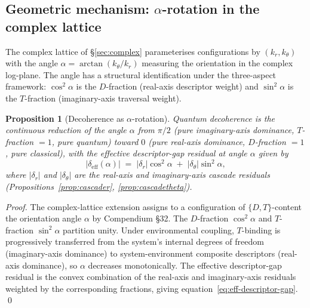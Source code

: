\documentclass[11pt,a4paper]{article}
\newtheorem{proposition}[theorem]{Proposition}
\theoremstyle{definition}
\theoremstyle{remark}
\begin{document}
\subsection{Geometric mechanism: \texorpdfstring{$\alpha$-rotation}{alpha-rotation} in the complex lattice}\label{subsec:alpha-rotation}

The complex lattice of \S\ref{sec:complex} parameterises configurations by $(k_{r}, k_{\theta})$ with the angle $\alpha = \arctan(k_{\theta}/k_{r})$ measuring the orientation in the complex log-plane. The angle has a structural identification under the three-aspect framework: $\cos^{2}\alpha$ is the $D$-fraction (real-axis descriptor weight) and $\sin^{2}\alpha$ is the $T$-fraction (imaginary-axis traversal weight).

\begin{proposition}[Decoherence as $\alpha$-rotation]\label{prop:alpha-rotation}
Quantum decoherence is the continuous reduction of the angle $\alpha$ from $\pi/2$ (pure imaginary-axis dominance, $T$-fraction $= 1$, pure quantum) toward $0$ (pure real-axis dominance, $D$-fraction $= 1$, pure classical), with the effective descriptor-gap residual at angle $\alpha$ given by
\begin{equation}\label{eq:eff-descriptor-gap}
|\delta_{\mathrm{eff}}(\alpha)| \;=\; |\delta_{r}|\cos^{2}\alpha \;+\; |\delta_{\theta}|\sin^{2}\alpha,
\end{equation}
where $|\delta_{r}|$ and $|\delta_{\theta}|$ are the real-axis and imaginary-axis cascade residuals (Propositions~\ref{prop:cascader}, \ref{prop:cascadetheta}).
\end{proposition}

\begin{proof}
The complex-lattice extension assigns to a configuration of $\{D,T\}$-content the orientation angle $\alpha$ by Compendium \S32. The $D$-fraction $\cos^{2}\alpha$ and $T$-fraction $\sin^{2}\alpha$ partition unity. Under environmental coupling, $T$-binding is progressively transferred from the system's internal degrees of freedom (imaginary-axis dominance) to system-environment composite descriptors (real-axis dominance), so $\alpha$ decreases monotonically. The effective descriptor-gap residual is the convex combination of the real-axis and imaginary-axis residuals weighted by the corresponding fractions, giving equation~\eqref{eq:eff-descriptor-gap}. \qed
\end{proof}
\end{document}
